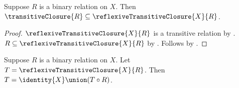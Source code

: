 \begin{proposition}\label{transitive_closure_subseteq_reflexive_transitive_closure}
    Suppose $R$ is a binary relation on $X$.
    Then $\transitiveClosure{R}\subseteq
        \reflexiveTransitiveClosure{X}{R}$.
\end{proposition}
\begin{proof}
    $\reflexiveTransitiveClosure{X}{R}$ is a transitive relation by
        .
    $R\subseteq\reflexiveTransitiveClosure{X}{R}$
        by .
    Follows by .
\end{proof}

\begin{theorem}\label{reflexive_transitive_closure_first_step_eq}
    Suppose $R$ is a binary relation on $X$.
    Let $T=\reflexiveTransitiveClosure{X}{R}$.
    Then $T=\identity{X}\union(T\circ R)$.
\end{theorem}
